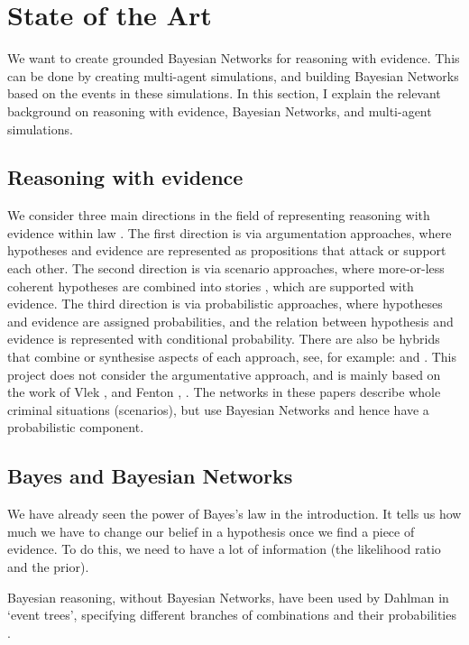
\chapter[State of the Art]{State of the Art}

We want to create grounded Bayesian Networks for reasoning with evidence. This can be done by creating multi-agent simulations, and building Bayesian Networks based on the events in these simulations. In this section, I explain the relevant background on reasoning with evidence, Bayesian Networks, and multi-agent simulations.

\section{Reasoning with evidence}
We consider three main directions in the field of representing reasoning with evidence within law \citep{Verheij2015}. The first direction is via argumentation approaches, where hypotheses and evidence are represented as propositions that attack or support each other. The second direction is via scenario approaches, where more-or-less coherent hypotheses are combined into stories \citep{Pennington1993}, which are supported with evidence. The third direction is via probabilistic approaches, where hypotheses and evidence are assigned probabilities, and the relation between hypothesis and evidence is represented with conditional probability. There are also be hybrids that combine or synthesise aspects of each approach, see, for example: \citep{Bex2010} and \citep{Timmer2016}. This project does not consider the argumentative approach, and is mainly based on the work of Vlek \citep{Vlek2015}, \citep{Vlek2016} and Fenton \citep{Fenton2012}, \citep{Fenton2019}. The networks in these papers describe whole criminal situations (scenarios), but use Bayesian Networks and hence have a probabilistic component.


\section{Bayes and Bayesian Networks}

We have already seen the power of Bayes's law in the introduction. It tells us how much we have to change our belief in a hypothesis once we find a piece of evidence. To do this, we need to have a lot of information (the likelihood ratio and the prior). 

Bayesian reasoning, without Bayesian Networks, have been used by Dahlman in `event trees', specifying different branches of combinations and their probabilities \citep{dahlman2020}.

